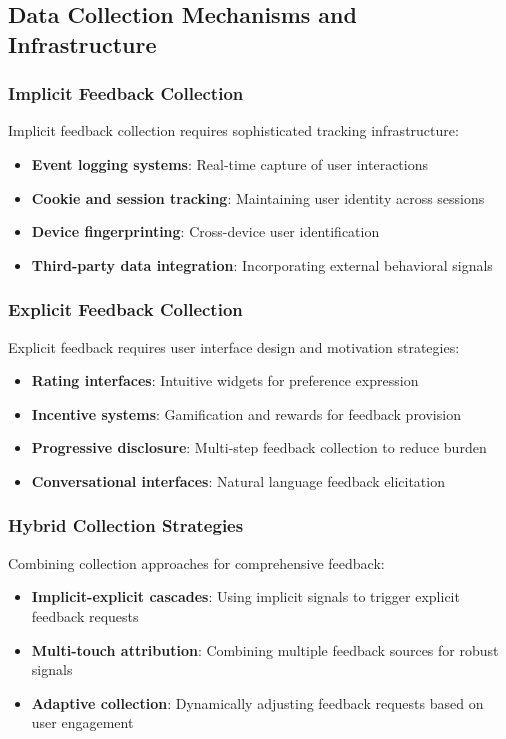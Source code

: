 \documentclass[acmsmall,review,anonymous]{acmart}
\begin{document}
\subsection{Data Collection Mechanisms and Infrastructure}

\subsubsection{Implicit Feedback Collection}

Implicit feedback collection requires sophisticated tracking infrastructure:
\begin{itemize}
    \item \textbf{Event logging systems}: Real-time capture of user interactions
    \item \textbf{Cookie and session tracking}: Maintaining user identity across sessions
    \item \textbf{Device fingerprinting}: Cross-device user identification
    \item \textbf{Third-party data integration}: Incorporating external behavioral signals
\end{itemize}

\subsubsection{Explicit Feedback Collection}

Explicit feedback requires user interface design and motivation strategies:
\begin{itemize}
    \item \textbf{Rating interfaces}: Intuitive widgets for preference expression
    \item \textbf{Incentive systems}: Gamification and rewards for feedback provision
    \item \textbf{Progressive disclosure}: Multi-step feedback collection to reduce burden
    \item \textbf{Conversational interfaces}: Natural language feedback elicitation
\end{itemize}

\subsubsection{Hybrid Collection Strategies}

Combining collection approaches for comprehensive feedback:
\begin{itemize}
    \item \textbf{Implicit-explicit cascades}: Using implicit signals to trigger explicit feedback requests
    \item \textbf{Multi-touch attribution}: Combining multiple feedback sources for robust signals
    \item \textbf{Adaptive collection}: Dynamically adjusting feedback requests based on user engagement
\end{itemize}
\end{document}
